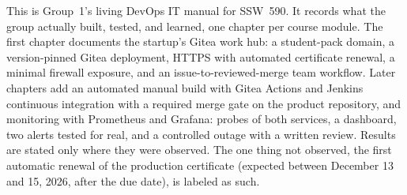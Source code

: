 This is Group~1's living DevOps IT manual for SSW~590. It records what the
group actually built, tested, and learned, one chapter per course module. The
first chapter documents the startup's Gitea work hub: a student-pack domain,
a version-pinned Gitea deployment, HTTPS with automated certificate renewal, a
minimal firewall exposure, and an issue-to-reviewed-merge team workflow. Later
chapters add an automated manual build with Gitea Actions and Jenkins continuous
integration with a required merge gate on the product repository, and monitoring
with Prometheus and Grafana: probes of both services, a dashboard, two alerts
tested for real, and a controlled outage with a written review. Results
are stated only where they were observed. The one thing not observed, the first
automatic renewal of the production certificate (expected between December 13 and
15, 2026, after the due date), is labeled as such.
